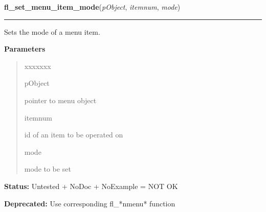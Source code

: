     \vspace{0.5ex}

\hspace{.8\funcindent}\begin{boxedminipage}{\funcwidth}

    \raggedright \textbf{fl\_set\_menu\_item\_mode}(\textit{pObject}, \textit{itemnum}, \textit{mode})

    \vspace{-1.5ex}

    \rule{\textwidth}{0.5\fboxrule}
\setlength{\parskip}{2ex}
    Sets the mode of a menu item.

\setlength{\parskip}{1ex}
      \textbf{Parameters}
      \vspace{-1ex}

      \begin{quote}
        \begin{Ventry}{xxxxxxx}

          \item[pObject]

          pointer to menu object

          \item[itemnum]

          id of an item to be operated on

          \item[mode]

          mode to be set

        \end{Ventry}

      \end{quote}

\textbf{Status:} Untested + NoDoc + NoExample = NOT OK



\textbf{Deprecated:} Use corresponding fl\_*nmenu* function



    \end{boxedminipage}

    \label{xformslib:deprecated:fl_show_menu_symbol}

    \vspace{0.5ex}

